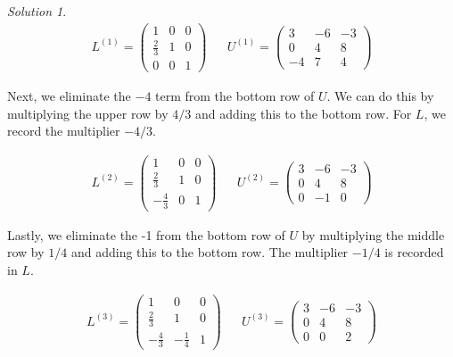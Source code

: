 \documentclass[12pt,a4paper]{article}
\theoremstyle{definition}
\theoremstyle{remark}
\newtheorem*{solution}{Solution}
\begin{document}
\begin{solution}
    \begin{align*}
        L^{(1)} = \begin{pmatrix}
            1 & 0 & 0 \\
            \frac{2}{3} & 1 & 0 \\
            0 & 0 & 1
        \end{pmatrix} &&
        U^{(1)} = \begin{pmatrix}
            3 & -6 & -3 \\
            0 & 4 & 8 \\
            -4 & 7 & 4
        \end{pmatrix}
    \end{align*}

    Next, we eliminate the $-4$ term from the bottom row of $U$. We can do this by multiplying the upper row by $4/3$ and adding this to the bottom row. For $L$, we record the multiplier $-4/3$. 

    \begin{align*}
        L^{(2)} = \begin{pmatrix}
            1 & 0 & 0 \\
            \frac{2}{3} & 1 & 0 \\
            -\frac{4}{3} & 0 & 1
        \end{pmatrix} &&
        U^{(2)} = \begin{pmatrix}
            3 & -6 & -3 \\
            0 & 4 & 8 \\
            0 & -1 & 0
        \end{pmatrix}
    \end{align*}

    Lastly, we eliminate the -1 from the bottom row of $U$ by multiplying the middle row by $1/4$ and adding this to the bottom row. The multiplier $-1/4$ is recorded in $L$. 

    \begin{align*}
        L^{(3)} = \begin{pmatrix}
            1 & 0 & 0 \\
            \frac{2}{3} & 1 & 0 \\
            -\frac{4}{3} & -\frac{1}{4} & 1
        \end{pmatrix} &&
        U^{(3)} = \begin{pmatrix}
            3 & -6 & -3 \\
            0 & 4 & 8 \\
            0 & 0 & 2
        \end{pmatrix}
    \end{align*}   
    

\end{solution}
\end{document}
